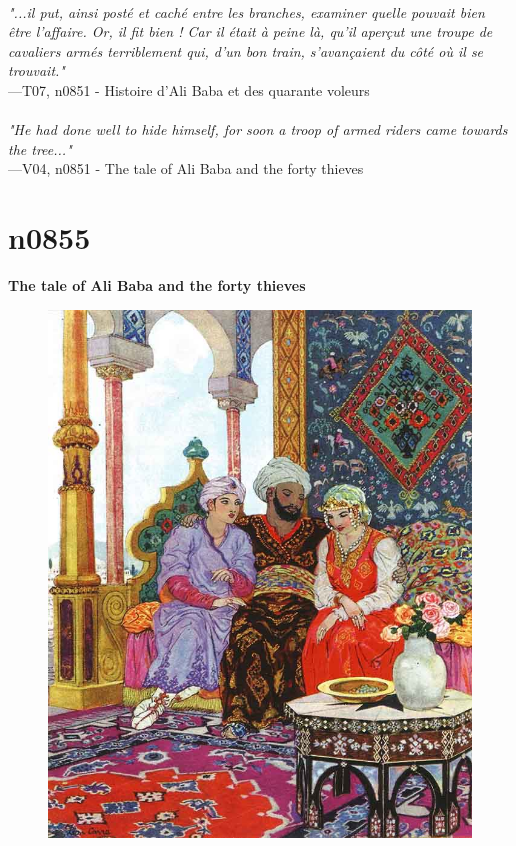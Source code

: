 \documentclass[../Carre_nights.tex]{subfiles}
\begin{document}
\textit{\\
"...il put, ainsi posté et caché entre les branches, examiner quelle pouvait bien être l’affaire. Or, il fit bien ! Car il était à peine là, qu’il aperçut une troupe de cavaliers armés terriblement qui, d’un bon train, s’avançaient du côté où il se trouvait."} \\
—T07, n0851 - Histoire d'Ali Baba et des quarante voleurs \\~\\
\textit{"He had done well to hide himself, for soon a troop of armed riders came towards the tree..."} \\
—V04, n0851 - The tale of Ali Baba and the forty thieves

\newpage

\section{n0855}
\textbf{\Large{The tale of Ali Baba and the forty thieves}} \\

\begin{figure}[ht]
\centering
\includegraphics[height=\figsize]{illustrations/volume_7/T07, n0855 - Histoire d'Ali Baba et des quarante voleurs.jpg}
\end{figure}
\end{document}
